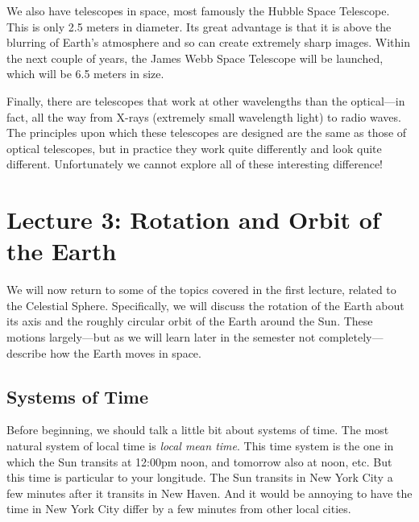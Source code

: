 \documentclass[12pt, preprint]{aastex}
\begin{document}
We also have telescopes in space, most famously the Hubble Space
Telescope. This is only 2.5 meters in diameter. Its great advantage is
that it is above the blurring of Earth's atmosphere and so can create
extremely sharp images. Within the next couple of years, the James
Webb Space Telescope will be launched, which will be 6.5 meters in
size.

Finally, there are telescopes that work at other wavelengths than the
optical---in fact, all the way from X-rays (extremely small wavelength
light) to radio waves. The principles upon which these telescopes are
designed are the same as those of optical telescopes, but in practice
they work quite differently and look quite different.  Unfortunately
we cannot explore all of these interesting difference!


\clearpage

\section{Lecture 3: Rotation and Orbit of the Earth}

We will now return to some of the topics covered in the first lecture,
related to the Celestial Sphere. Specifically, we will discuss the
rotation of the Earth about its axis and the roughly circular orbit of
the Earth around the Sun. These motions largely---but as we will learn
later in the semester not completely---describe how the Earth moves in
space.

\subsection{Systems of Time}

Before beginning, we should talk a little bit about systems of
time. The most natural system of local time is {\it local mean time}.
This time system is the one in which the Sun transits at 12:00pm noon,
and tomorrow also at noon, etc. But this time is particular to your
longitude. The Sun transits in New York City a few minutes after it
transits in New Haven. And it would be annoying to have the time in
New York City differ by a few minutes from other local cities.
\end{document}
